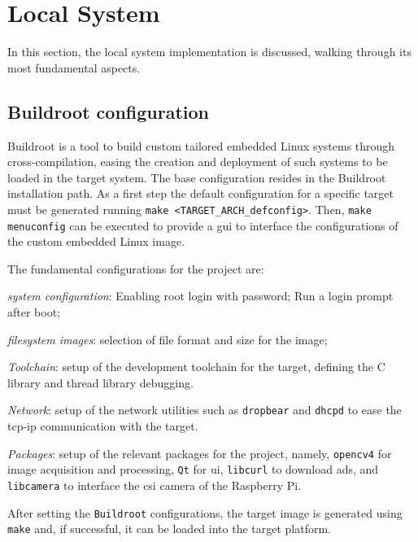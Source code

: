 \section{Local System}
\label{sec:local-system-1}
In this section, the local system implementation is discussed, walking through
its most fundamental aspects.

\subsection{Buildroot configuration}
\label{sec:buildr-conf}
Buildroot is a tool to build custom tailored embedded Linux systems through
cross-compilation, easing the creation and deployment of such systems to be
loaded in the target system.
The base configuration resides in the Buildroot installation path. As a first
step the default configuration for a specific target must be generated running
\texttt{make <TARGET\_ARCH\_defconfig>}. Then, \texttt{make menuconfig} can be
executed to provide a \gls{gui} to interface the configurations of the custom
embedded Linux image.

The fundamental configurations for the project are:
\begin{item-c}
\item \emph{system configuration}: Enabling root login with password; Run a login
  prompt after boot;
\item \emph{filesystem images}: selection of file format and size for the image;
\item \emph{Toolchain}: setup of the development toolchain for the target,
  defining the C library and thread library debugging.
\item \emph{Network}: setup of the network utilities such as \texttt{dropbear}
  and \texttt{dhcpd} to ease the \gls{tcp-ip} communication with the target.
\item \emph{Packages}: setup of the relevant packages for the project, namely,
  \texttt{opencv4} for image acquisition and processing, \texttt{Qt} for
  \gls{ui}, \texttt{libcurl} to download ads, and \texttt{libcamera} to
  interface the \gls{csi} camera of the Raspberry Pi. 
\end{item-c}

After setting the \texttt{Buildroot} configurations, the target image is
generated using \texttt{make} and, if successful, it can be loaded into the
target platform.


